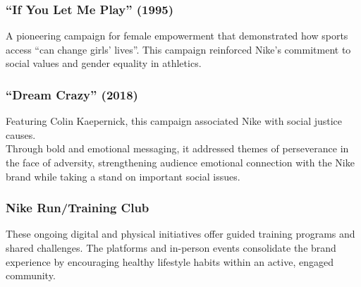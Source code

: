 \documentclass[letterpaper, 12pt]{article}
\begin{document}
\subsubsection{``If You Let Me Play'' (1995)}
A pioneering campaign for female empowerment that demonstrated how sports access ``can change girls' lives''. This campaign reinforced Nike's commitment to social values and gender equality in athletics.

\subsubsection{``Dream Crazy'' (2018)}
Featuring Colin Kaepernick, this campaign associated Nike with social justice causes. \\ Through bold and emotional messaging, it addressed themes of perseverance in the face of adversity, strengthening audience emotional connection with the Nike brand while taking a stand on important social issues.

\subsubsection{Nike Run/Training Club}
These ongoing digital and physical initiatives offer guided training programs and shared challenges. The platforms and in-person events consolidate the brand experience by encouraging healthy lifestyle habits within an active, engaged community.


\newpage
\printbibliography
\end{document}
